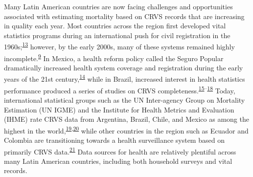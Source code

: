 \documentclass[
]{article}
\begin{document}
Many Latin American countries are now facing challenges and opportunities associated with estimating mortality based on CRVS records that are increasing in quality each year. Most countries across the region first developed vital statistics programs during an international push for civil registration in the 1960s;\textsuperscript{\protect\hyperlink{ref-Rao2019}{13}} however, by the early 2000s, many of these systems remained highly incomplete.\textsuperscript{\protect\hyperlink{ref-Mikkelsen2015}{9}} In Mexico, a health reform policy called the Seguro Popular dramatically increased health system coverage and registration during the early years of the 21st century,\textsuperscript{\protect\hyperlink{ref-Frenk2006}{14}} while in Brazil, increased interest in health statistics performance produced a series of studies on CRVS completeness.\textsuperscript{\protect\hyperlink{ref-Schmid2011}{15}--\protect\hyperlink{ref-Lima2018}{18}} Today, international statistical groups such as the UN Inter-agency Group on Mortality Estimation (UN IGME) and the Institute for Health Metrics and Evaluation (IHME) rate CRVS data from Argentina, Brazil, Chile, and Mexico as among the highest in the world,\textsuperscript{\protect\hyperlink{ref-UNInter-agencyGrouponMortalityEstimationUNIGME2020}{19},\protect\hyperlink{ref-Dicker2018}{20}} while other countries in the region such as Ecuador and Colombia are transitioning towards a health surveillance system based on primarily CRVS data.\textsuperscript{\protect\hyperlink{ref-Ribotta2019}{21}} Data sources for health are relatively plentiful across many Latin American countries, including both household surveys and vital records.
\end{document}
